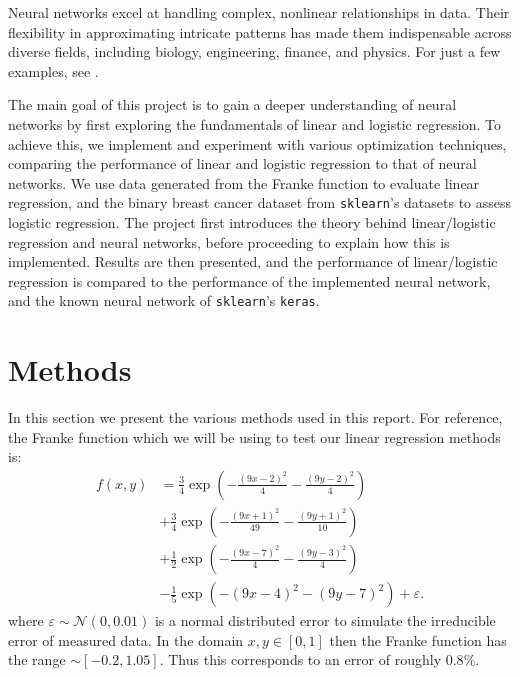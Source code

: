 \documentclass[%
reprint,s
amsmath,amssymb,
aps,
]{revtex4-2}
\begin{document}
Neural networks excel at handling complex, nonlinear relationships in data. Their flexibility in approximating intricate patterns has made them indispensable across diverse fields, including biology, engineering, finance, and physics. For just a few examples, see \cite{dawid2023modernapplicationsmachinelearning,thapar2023applicationsmachinelearningmodelling,mohammadi2022applicationsmachinelearninghealthcare}.

The main goal of this project is to gain a deeper understanding of neural networks by first exploring the fundamentals of linear and logistic regression. To achieve this, we implement and experiment with various optimization techniques, comparing the performance of linear and logistic regression to that of neural networks. We use data generated from the Franke function to evaluate linear regression, and the binary breast cancer dataset from \texttt{sklearn}'s datasets \cite{sklearn} to assess logistic regression. The project first introduces the theory behind linear/logistic regression and neural networks, before proceeding to explain how this is implemented. Results are then presented, and the performance of linear/logistic regression is compared to the performance of the implemented neural network, and the known neural network of \texttt{sklearn}'s \texttt{keras}.

\section{Methods}
In this section we present the various methods used in this report. For reference, the Franke function which we will be using to test our linear regression methods is:
\begin{align}	\label{eq:franke}
	f(x,y)&=\frac{3}{4}\exp(-\frac{(9x-2)^2}{4}-\frac{(9y-2)^2}{4})\nonumber\\
	&+\frac{3}{4}\exp(-\frac{(9x+1)^2}{49}-\frac{(9y+1)^2}{10})\nonumber\\
	&+\frac{1}{2}\exp(-\frac{(9x-7)^2}{4}-\frac{(9y-3)^2}{4})\nonumber\\
	&-\frac{1}{5}\exp(-(9x-4)^2-(9y-7)^2)+\varepsilon.
\end{align}
where $\varepsilon\sim\mathcal{N}(0,0.01)$ is a normal distributed error to simulate the irreducible error of measured data. In the domain $x,y\in[0,1]$ then the Franke function has the range $\sim[-0.2,1.05]$. Thus this corresponds to an error of roughly $0.8\%$. 
\end{document}
